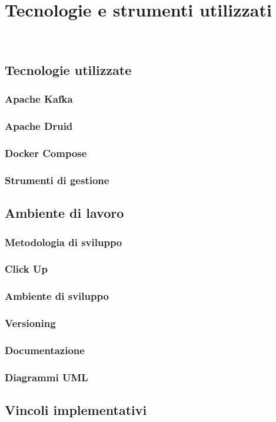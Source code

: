 \chapter{Tecnologie e strumenti utilizzati}\label{cap:Tecnologie e strumenti utilizzati}


\\

\section{Tecnologie utilizzate}
\subsection{Apache Kafka}
\subsection{Apache Druid}
\subsection{Docker Compose}
\subsection{Strumenti di gestione}
\section{Ambiente di lavoro}
\subsection{Metodologia di sviluppo}
\subsection{Click Up}   %
\subsection{Ambiente di sviluppo}
\subsection{Versioning}
\subsection{Documentazione}
\subsection{Diagrammi UML}

\section{Vincoli implementativi}
